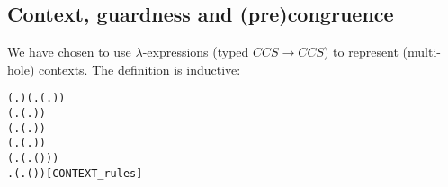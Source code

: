 
\subsection{Context, guardness and (pre)congruence}


We have chosen to use $\lambda$-expressions (typed
$CCS\rightarrow CCS$) to represent  (multi-hole) 
contexts. The definition is inductive:
\begin{alltt}
\HOLTokenTurnstile{}  (\HOLTokenLambda{}. ) \HOLSymConst{\HOLTokenConj{}} (\HOLSymConst{\HOLTokenForall{}}.  (\HOLTokenLambda{}. )) \HOLSymConst{\HOLTokenConj{}}
   (\HOLSymConst{\HOLTokenForall{}} .   \HOLSymConst{\HOLTokenImp{}}  (\HOLTokenLambda{}.  )) \HOLSymConst{\HOLTokenConj{}}
   (\HOLSymConst{\HOLTokenForall{}} .   \HOLSymConst{\HOLTokenConj{}}   \HOLSymConst{\HOLTokenImp{}}  (\HOLTokenLambda{}.   \HOLSymConst{+}  )) \HOLSymConst{\HOLTokenConj{}}
   (\HOLSymConst{\HOLTokenForall{}} .   \HOLSymConst{\HOLTokenConj{}}   \HOLSymConst{\HOLTokenImp{}}  (\HOLTokenLambda{}.   \HOLSymConst{\ensuremath{\parallel}}  )) \HOLSymConst{\HOLTokenConj{}}
   (\HOLSymConst{\HOLTokenForall{}} .   \HOLSymConst{\HOLTokenImp{}}  (\HOLTokenLambda{}. \HOLSymConst{\ensuremath{\nu}}  ( ))) \HOLSymConst{\HOLTokenConj{}}
   \HOLSymConst{\HOLTokenForall{}} .   \HOLSymConst{\HOLTokenImp{}}  (\HOLTokenLambda{}.  ( ) )\hfill{[CONTEXT_rules]}
\end{alltt}

